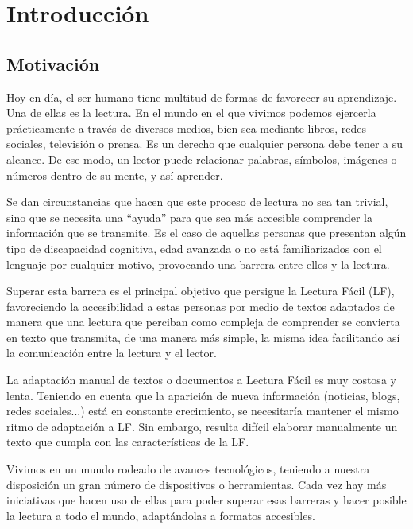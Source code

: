 \chapter{Introducción}
\label{cap:introduccion}


\section{Motivación}
Hoy en día, el ser humano tiene multitud de formas de favorecer su aprendizaje. Una de ellas es la lectura. En el mundo en el que vivimos podemos ejercerla prácticamente a través de diversos medios, bien sea mediante libros, redes sociales, televisión o prensa. Es un derecho que cualquier persona debe tener a su alcance. De ese modo, un lector puede relacionar palabras, símbolos, imágenes o números dentro de su mente, y así aprender.


 \setlength{\parskip}{10pt}

 Se dan circunstancias que hacen que este proceso de lectura no sea tan trivial, sino que se necesita una ``ayuda'' para que sea más accesible comprender la información que se transmite. Es el caso de aquellas personas que presentan algún tipo de discapacidad cognitiva, edad avanzada o no está familiarizados con el lenguaje por cualquier motivo, provocando una barrera entre ellos y la lectura.
 
  Superar esta barrera es el principal objetivo que persigue la Lectura Fácil (LF), favoreciendo la accesibilidad a estas personas por medio de textos adaptados de manera que una lectura que perciban como compleja de comprender se convierta en texto que transmita, de una manera más simple, la misma idea facilitando así la comunicación entre la lectura y el lector.
 
 \setlength{\parskip}{10pt}
 

La adaptación manual de textos o documentos a Lectura Fácil es muy costosa y lenta. Teniendo en cuenta que la aparición de nueva información (noticias, blogs, redes sociales...) está en constante crecimiento, se necesitaría mantener el mismo ritmo de adaptación a LF. Sin embargo, resulta difícil elaborar manualmente un texto que cumpla con las características de la LF. 
 

\setlength{\parskip}{10pt}
Vivimos en un mundo rodeado de avances tecnológicos, teniendo a nuestra disposición un gran número de dispositivos o herramientas. Cada vez hay más iniciativas que hacen uso de ellas para poder superar esas barreras y hacer posible la lectura a todo el mundo, adaptándolas a formatos accesibles. 


